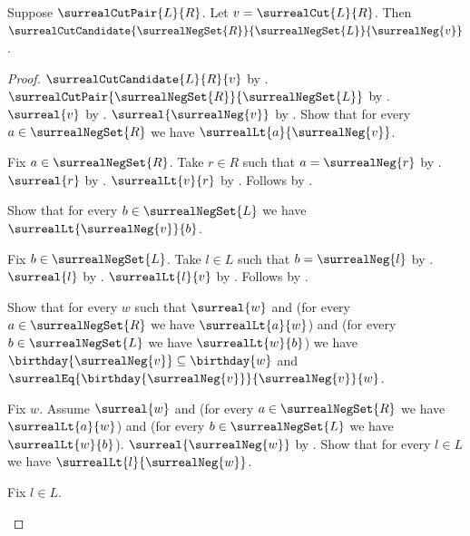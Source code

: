 \begin{theorem}\label{surreal_negation_cut_candidate}
    Suppose $\surrealCutPair{L}{R}$.
    Let $v=\surrealCut{L}{R}$.
    Then $\surrealCutCandidate
        {\surrealNegSet{R}}{\surrealNegSet{L}}{\surrealNeg{v}}$.
\end{theorem}
\begin{proof}
    $\surrealCutCandidate{L}{R}{v}$
        by .
    $\surrealCutPair{\surrealNegSet{R}}{\surrealNegSet{L}}$
        by .
    $\surreal{v}$ by .
    $\surreal{\surrealNeg{v}}$
        by .
    Show that for every $a\in\surrealNegSet{R}$ we have
        $\surrealLt{a}{\surrealNeg{v}}$.
    \begin{subproof}
        Fix $a\in\surrealNegSet{R}$.
        Take $r\in R$ such that $a=\surrealNeg{r}$
            by .
        $\surreal{r}$ by .
        $\surrealLt{v}{r}$ by .
        Follows by .
    \end{subproof}
    Show that for every $b\in\surrealNegSet{L}$ we have
        $\surrealLt{\surrealNeg{v}}{b}$.
    \begin{subproof}
        Fix $b\in\surrealNegSet{L}$.
        Take $l\in L$ such that $b=\surrealNeg{l}$
            by .
        $\surreal{l}$ by .
        $\surrealLt{l}{v}$ by .
        Follows by .
    \end{subproof}
    Show that for every $w$ such that
        $\surreal{w}$ and
        (for every $a\in\surrealNegSet{R}$ we have $\surrealLt{a}{w}$) and
        (for every $b\in\surrealNegSet{L}$ we have $\surrealLt{w}{b}$)
        we have $\birthday{\surrealNeg{v}}\subseteq\birthday{w}$ and
            $\surrealEq{\birthday{\surrealNeg{v}}}{\surrealNeg{v}}{w}$.
    \begin{subproof}
        Fix $w$.
        Assume $\surreal{w}$ and
            (for every $a\in\surrealNegSet{R}$ we have $\surrealLt{a}{w}$) and
            (for every $b\in\surrealNegSet{L}$ we have $\surrealLt{w}{b}$).
        $\surreal{\surrealNeg{w}}$
            by .
        Show that for every $l\in L$ we have
            $\surrealLt{l}{\surrealNeg{w}}$.
        \begin{subproof}
            Fix $l\in L$.

\end{subproof}
\end{subproof}
\end{proof}
